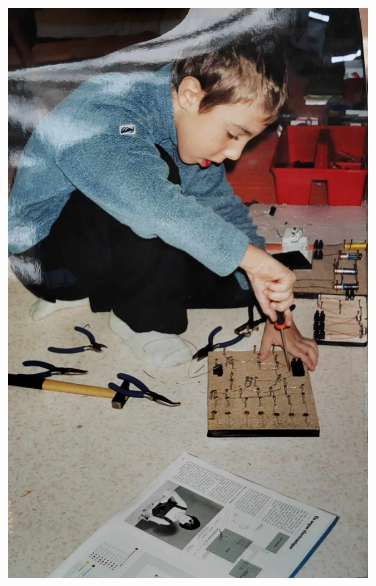 \begin{frame}
\begin{columns}
\begin{column}{0.4\textwidth}
\begin{figure}[H]
		\includegraphics[width=0.85\textwidth]{moi2.jpg}
	\end{figure}
\end{column}
\end{columns}
\end{frame}

